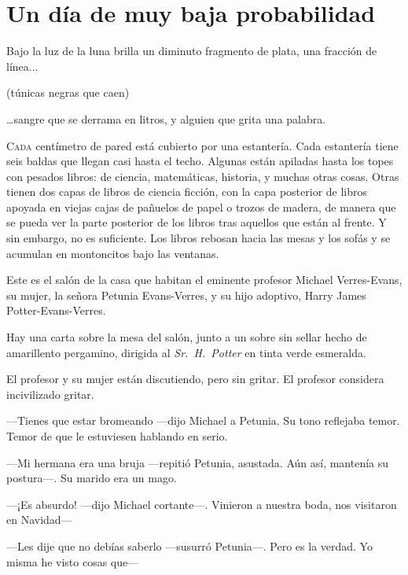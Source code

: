 \chapter{Un día de muy baja probabilidad}

\begin{chapterOpeningQuote}
	\noindent
	Bajo la luz de la luna brilla un diminuto fragmento de plata, una fracción de línea...

	\vspace*{2ex}
	(túnicas negras que caen)

	\vspace*{2ex}
	…sangre que se derrama en litros, y alguien que grita una palabra.
\end{chapterOpeningQuote}

\lettrine{C}{ada} centímetro de pared está cubierto por una estantería. Cada estantería tiene seis baldas que llegan casi hasta el techo. Algunas están apiladas hasta los topes con pesados libros: de ciencia, matemáticas, historia, y muchas otras cosas. Otras tienen dos capas de libros de ciencia ficción, con la capa posterior de libros apoyada en viejas cajas de pañuelos de papel o trozos de madera, de manera que se pueda ver la parte posterior de los libros tras aquellos que están al frente. Y sin embargo, no es suficiente. Los libros rebosan hacia las mesas y los sofás y se acumulan en montoncitos bajo las ventanas.

Este es el salón de la casa que habitan el eminente profesor Michael Verres-Evans, su mujer, la señora Petunia Evans-Verres, y su hijo adoptivo, Harry James Potter-Evans-Verres.

Hay una carta sobre la mesa del salón, junto a un sobre sin sellar hecho de amarillento pergamino, dirigida al \emph{Sr.~H.~Potter} en tinta verde esmeralda.

El profesor y su mujer están discutiendo, pero sin gritar. El profesor considera incivilizado gritar.

—Tienes que estar bromeando —dijo Michael a Petunia. Su tono reflejaba temor. Temor de que le estuviesen hablando en serio.

—Mi hermana era una bruja —repitió Petunia, asustada. Aún así, mantenía su postura—. Su marido era un mago.

—¡Es absurdo! —dijo Michael cortante—. Vinieron a nuestra boda, nos visitaron en Navidad—

—Les dije que no debías saberlo —susurró Petunia—. Pero es la verdad. Yo misma he visto cosas que—

